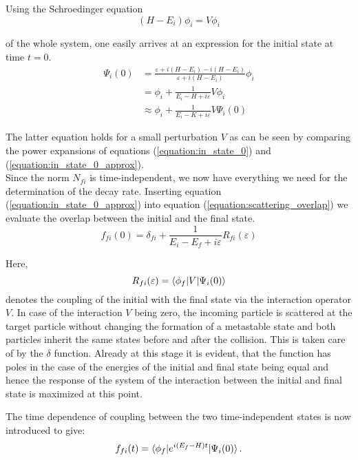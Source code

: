 Using the Schroedinger equation
\begin{equation}
  (H-E_i) \phi_i = V \phi_i
\end{equation}

of the whole system, one easily arrives at an expression for the initial state
at time $t=0$.
\begin{align}
  \Psi_i(0) &= \frac{\varepsilon + i(H-E_i) - i(H-E_i)}{\varepsilon + i(H-E_i)} \phi_i\\
            &= \phi_i + \frac{1}{E_i-H+i\varepsilon} V \phi_i \label{equation:in_state_0}\\
            &\approx \phi_i + \frac{1}{E_i-K+i\varepsilon} V \Psi_i(0) \label{equation:in_state_0_approx}
\end{align}

The latter equation holds for a small perturbation $V$ as can be seen by comparing
the power expansions of equations (\ref{equation:in_state_0}) and
(\ref{equation:in_state_0_approx}).\\
Since the norm $N_{fi}$ is time-independent, we now have
everything we need for the determination of the decay rate.
Inserting equation (\ref{equation:in_state_0_approx}) into equation
(\ref{equation:scattering_overlap}) we evaluate the overlap between the initial
and the final state.
\begin{equation}
  f_{fi}(0) = \delta_{fi} + \frac{1}{E_i-E_f+i\varepsilon} R_{fi}(\varepsilon)
\end{equation}

Here, 
\begin{equation}
  R_{fi}(\varepsilon) = \braket{\phi_f|V|\Psi_i(0)}
\end{equation}
denotes the coupling of the initial with the final state via the interaction
operator $V$. In case of the interaction $V$ being zero, the incoming particle
is scattered at the target particle without changing the formation of a metastable
state and both particles inherit the same states before and after the collision.
This is taken care of by the $\delta$ function. Already at this stage it is evident,
that the function has
poles in the case of the energies of the initial and final state being equal
and hence the response of the system of the interaction between the initial and final
state is maximized at this point.

The time dependence of coupling between the two time-independent states is now
introduced to give:
\begin{equation}
  f_{fi}(t) = \braket{\phi_f| e^{i(E_f-H)t} |\Psi_i(0)} .
\end{equation}

